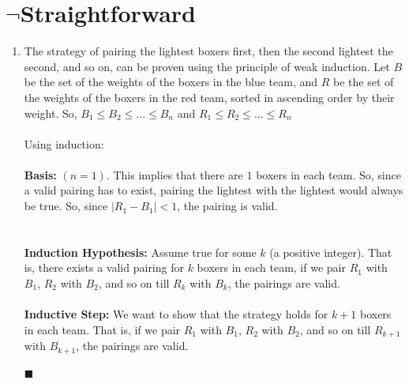 \documentclass[a4paper]{article}
\begin{document}
\section{$\neg$Straightforward}
\begin{enumerate}
\item The strategy of pairing the lightest boxers first, then the second lightest the second, and so on, can be proven using the principle of weak induction. Let $B$ be the set of the weights of the boxers in the blue team, and $R$ be the set of the weights of the boxers in the red team, sorted in ascending order by their weight. So, $B_1 \leq B_2 \leq ... \leq B_n$ and $R_1 \leq R_2 \leq ... \leq R_n$ \\
\\
Using induction:\\
\\
\textbf{Basis:} $(n=1)$. This implies that there are $1$ boxers in each team. So, since a valid pairing has to exist, pairing the lightest with the lightest would always be true. So, since $|R_1 - B_1| < 1$, the pairing is valid.\\
\\
\\
\textbf{Induction Hypothesis:} Assume true for some $k$ (a positive integer). That is, there exists a valid pairing for $k$ boxers in each team, if we pair $R_1$ with $B_1$, $R_2$ with $B_2$, and so on till $R_k$ with $B_k$, the pairings are valid. \\
\\
\textbf{Inductive Step:} We want to show that the strategy holds for $k+1$ boxers in each team. That is, if we pair $R_1$ with $B_1$, $R_2$ with $B_2$, and so on till $R_{k+1}$ with $B_{k+1}$, the pairings are valid.\\
\\

$\blacksquare$\\


\end{enumerate}
\end{document}
